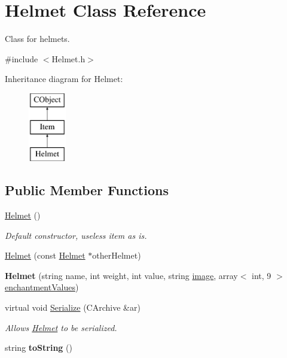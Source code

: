 \hypertarget{class_helmet}{}\section{Helmet Class Reference}
\label{class_helmet}


Class for helmets.  




{\ttfamily \#include $<$Helmet.\+h$>$}

Inheritance diagram for Helmet\+:\begin{figure}[H]
\begin{center}
\leavevmode
\includegraphics[height=3.000000cm]{class_helmet}
\end{center}
\end{figure}
\subsection*{Public Member Functions}
\begin{DoxyCompactItemize}
\item 
\hypertarget{class_helmet_ae9f39c8ca82962c770f9907123e663f5}{}\label{class_helmet_ae9f39c8ca82962c770f9907123e663f5} 
\hyperlink{class_helmet_ae9f39c8ca82962c770f9907123e663f5}{Helmet} ()
\begin{DoxyCompactList}\small\item\em Default constructor, useless item as is. \end{DoxyCompactList}\item 
\hyperlink{class_helmet_a27eceb089c04d2dcab69d49d30d7b92c}{Helmet} (const \hyperlink{class_helmet}{Helmet} $\ast$other\+Helmet)
\item 
\hypertarget{class_helmet_a53c7728aebd2aadb37082834cbec4968}{}\label{class_helmet_a53c7728aebd2aadb37082834cbec4968} 
{\bfseries Helmet} (string name, int weight, int value, string \hyperlink{class_item_add84a42b692ee5d580a92ae4a922f784}{image}, array$<$ int, 9 $>$ \hyperlink{class_item_a8532d8729f9433f41b7fc18b20d83236}{enchantment\+Values})
\item 
\hypertarget{class_helmet_abb01d02590723236e9cf9e260824e712}{}\label{class_helmet_abb01d02590723236e9cf9e260824e712} 
virtual void \hyperlink{class_helmet_abb01d02590723236e9cf9e260824e712}{Serialize} (C\+Archive \&ar)
\begin{DoxyCompactList}\small\item\em Allows \hyperlink{class_helmet}{Helmet} to be serialized. \end{DoxyCompactList}\item 
\hypertarget{class_helmet_afc4c216aed5d9402d9e33b95b1e2f9a3}{}\label{class_helmet_afc4c216aed5d9402d9e33b95b1e2f9a3} 
string {\bfseries to\+String} ()
\end{DoxyCompactItemize}
